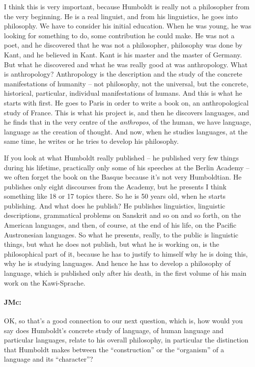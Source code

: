 \documentclass[output=paper]{langscibook}
\begin{document}
I think this is very important, because Humboldt is really not a philosopher from the very beginning. He is a real linguist, and from his linguistics, he goes into philosophy. We have to consider his initial education. When he was young, he was looking for something to do, some contribution he could make. He was not a poet, and he discovered that he was not a philosopher, philosophy was done by Kant, and he believed in Kant. Kant is his master and the master of Germany. But what he discovered and what he was really good at was anthropology. What is anthropology? Anthropology is the description and the study of the concrete manifestations of humanity – not philosophy, not the universal, but the concrete, historical, particular, individual manifestations of humans. And this is what he starts with first. He goes to Paris in order to write a book on, an anthropological study of France. This is what his project is, and then he discovers languages, and he finds that in the very centre of the \textit{anthropos}, of the human, we have language, language as the creation of thought. And now, when he studies languages, at the same time, he writes or he tries to develop his philosophy. 

If you look at what Humboldt really published – he published very few things during his lifetime, practically only some of his speeches at the Berlin Academy – we often forget the book on the Basque because it’s not very Humboldtian. He publishes only eight discourses from the Academy, but he presents I think something like 18 or 17 topics there. So he is 50 years old, when he starts publishing. And what does he publish? He publishes linguistics, linguistic descriptions, grammatical problems on Sanskrit and so on and so forth, on the American languages, and then, of course, at the end of his life, on the Pacific Austronesian languages. So what he presents, really, to the public is linguistic things, but what he does not publish, but what he is working on, is the philosophical part of it, because he has to justify to himself why he is doing this, why he is studying languages. And hence he has to develop a philosophy of language, which is published only after his death, in the first volume of his main work on the Kawi-Sprache.


\paragraph*{JMc:} OK, so that’s a good connection to our next question, which is, how would you say does Humboldt’s concrete study of language, of human language and particular languages, relate to his overall philosophy, in particular the distinction that Humboldt makes between the “construction” or the “organism” of a language and its “character”?
\end{document}
